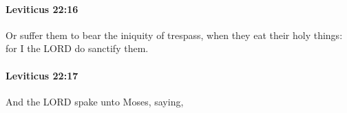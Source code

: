		\paragraph{Leviticus 22:16} %
			\label{LEVITICUS-22-16}

			Or suffer them to bear the iniquity of trespass, when they eat their holy things: for I the LORD do sanctify them.


		\paragraph{Leviticus 22:17} %
			\label{LEVITICUS-22-17}

			And the LORD spake unto Moses, saying,


